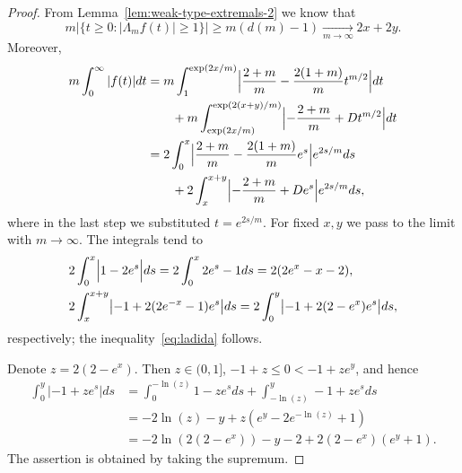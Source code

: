 \documentclass[a4paper]{amsart} %
\theoremstyle{definition}
\theoremstyle{remark}
\numberwithin{equation}{section}
\newcommand*{\dOne}{D}%
\begin{document}
\begin{proof}
		From Lemma~\ref{lem:weak-type-extremals-2} we know that 
		\begin{equation*}
		m\bigl|\{ t\geq 0 : |\Lambda_m f (t)| \geq 1 \} \bigr| 
		\geq m(d(m) - 1) \xrightarrow[m\to\infty]{} 2x + 2y. 
		\end{equation*}
	    Moreover,
	    \begin{align*}
		m \int_0^\infty |f(t)| dt 
		&=m\int_{1}^{\exp(2x/m)} \Bigl| \frac{2+m}{m} -  \frac{2(1+m)}{m}  t^{m/2}\Bigr| dt\\
		&\qquad  
		+ m\int_{\exp(2x/m)}^{\exp(2(x+y)/m)} \Bigl| -\frac{2+m}{m} + \dOne t^{m/2}\Bigr| dt\nonumber\\
		&= 2 \int_{0}^{x} \Bigl| \frac{2+m}{m} - \frac{2(1+m)}{m} e^{s} \Bigr| e^{2s/m} ds \\
		&\qquad	+  2\int_{x}^{x+y} \Bigl| -\frac{2+m}{m} + \dOne e^{s} \Bigr| e^{2s/m} ds,
		\end{align*}
		where in the last step we substituted $t = e^{2s/m}$.
		For fixed $x, y$ we pass to the limit with $m\to\infty$.
		The integrals tend to
		\begin{align*}
		&2\int_{0}^{x} \Bigl| 1 - 2 e^{s}\Bigr| ds    
		=  2\int_{0}^{x} 2 e^{s} -1 ds  
		= 2(2e^{x} -x - 2),\\
		&2 \int_{x }^{x+y} \bigl| -1 +  2(2 e^{-x } -1)  e^{s}\bigr| ds
		= 2\int_{0 }^{y} \bigl| -1 +  2(2-e^x) e^{s}\bigr| ds,
		\end{align*}
		respectively; the inequality~\eqref{eq:ladida} follows.
		
		
	Denote $z = 2(2-e^x)$. Then $z\in(0,1]$, $-1+z \leq 0 < -1+ze^y$, and hence
	 \begin{align*}
	\int_0^y | -1 + z e^s | ds
	 & = \int_{0}^{-\ln(z)} 1 -  z  e^{s} ds
	 + \int_{ -\ln(z)}^{y} -1 +  z e^{s} ds\\
	 & = - 2\ln(z)  - y  + z (e^y - 2e^{-\ln(z)} + 1)\\
	 & = - 2\ln(2(2-e^x)) - y - 2   + 2(2-e^x)(e^y + 1).
	 \end{align*} 
	 The assertion is obtained by taking the supremum.	
\end{proof}
\end{document}
